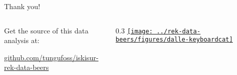 \begin{frame}{Thank you!}
\begin{columns}[T]
\begin{column}{0.6\textwidth}
            \vspace{12pt}

            Get the source of this data analysis at:
            \begin{center}
                \url{github.com/tungufoss/iskisur-rek-data-beers}

                \vspace{6pt}

                \ccbysa
            \end{center}
        \end{column}
        \begin{column} {0.3\textwidth}
            \href{https://www.youtube.com/watch?v=DK7CVqbtW0A}{
                \texttt{[image: ../rek-data-beers/figures/dalle-keyboardcat]}
            }
        \end{column}
    \end{columns}
\end{frame}